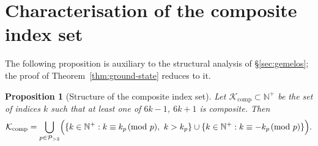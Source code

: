 \documentclass[11pt]{amsart}
\numberwithin{equation}{section}
\newcommand{\NN}{\mathbb{N}}
\newcommand{\cP}{\mathcal{P}}
\newcommand{\cK}{\mathcal{K}}
\theoremstyle{plain}
\newtheorem{proposition}[theorem]{Proposition}
\theoremstyle{definition}
\begin{document}
\section{Characterisation of the composite index set}
\label{app:composite-set}

The following proposition is auxiliary to the structural analysis of
\S\ref{sec:gemelos}; the proof of Theorem~\ref{thm:ground-state}
reduces to it.

\begin{proposition}[Structure of the composite index set]
\label{prop:composite}
Let $\cK_{\mathrm{comp}}\subset\NN^+$ be the set of indices $k$ such
that at least one of $6k-1$, $6k+1$ is composite. Then
\begin{equation}
\cK_{\mathrm{comp}}
=
\bigcup_{p\in\cP_{>3}}
\Bigl(
\{k\in\NN^+ : k\equiv k_p\!\!\pmod p,\ k>k_p\}
\cup
\{k\in\NN^+ : k\equiv -k_p\!\!\pmod p\}
\Bigr).
\label{eq:composite-set}
\end{equation}
\end{proposition}
\end{document}
